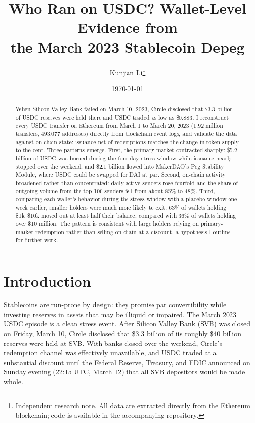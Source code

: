 \documentclass[11pt]{article}
\title{Who Ran on USDC? Wallet-Level Evidence from\\ the March 2023 Stablecoin Depeg}
\author{Kunjian Li\thanks{Independent research note. All data are extracted directly from the Ethereum blockchain; code is available in the accompanying repository.}}
\date{\today}
\begin{document}
\sloppy
\maketitle

\begin{abstract}
\noindent When Silicon Valley Bank failed on March 10, 2023, Circle disclosed that \$3.3 billion of USDC reserves were held there and USDC traded as low as \$0.883. I reconstruct every USDC transfer on Ethereum from March 1 to March 20, 2023 (1.92 million transfers, 493,077 addresses) directly from blockchain event logs, and validate the data against on-chain state: issuance net of redemptions matches the change in token supply to the cent. Three patterns emerge. First, the primary market contracted sharply: \$5.2 billion of USDC was burned during the four-day stress window while issuance nearly stopped over the weekend, and \$2.1 billion flowed into MakerDAO's Peg Stability Module, where USDC could be swapped for DAI at par. Second, on-chain activity broadened rather than concentrated: daily active senders rose fourfold and the share of outgoing volume from the top 100 senders fell from about 85\% to 48\%. Third, comparing each wallet's behavior during the stress window with a placebo window one week earlier, smaller holders were much more likely to exit: 63\% of wallets holding \$1k--\$10k moved out at least half their balance, compared with 36\% of wallets holding over \$10 million. The pattern is consistent with large holders relying on primary-market redemption rather than selling on-chain at a discount, a hypothesis I outline for further work.
\end{abstract}

\section{Introduction}

Stablecoins are run-prone by design: they promise par convertibility while investing reserves in assets that may be illiquid or impaired. The March 2023 USDC episode is a clean stress event. After Silicon Valley Bank (SVB) was closed on Friday, March 10, Circle disclosed that \$3.3 billion of its roughly \$40 billion reserves were held at SVB. With banks closed over the weekend, Circle's redemption channel was effectively unavailable, and USDC traded at a substantial discount until the Federal Reserve, Treasury, and FDIC announced on Sunday evening (22:15 UTC, March 12) that all SVB depositors would be made whole.
\end{document}
